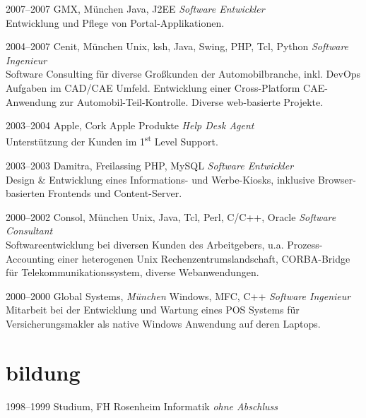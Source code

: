 \documentclass[]{friggeri-cv-a4}
\begin{document}
\begin{entrylist}
\entry
{2007--2007}
{GMX, München}
{Java, J2EE}
{\emph{Software Entwickler} \\
Entwicklung und Pflege von Portal-Applikationen.}
\end{entrylist}


\begin{entrylist}
\entry
{2004--2007}
{Cenit, München}
{Unix, ksh, Java, Swing, PHP, Tcl, Python}
{\emph{Software Ingenieur} \\
Software Consulting für diverse Großkunden der Automobilbranche, inkl. DevOps Aufgaben im CAD/CAE Umfeld. Entwicklung einer Cross-Platform CAE-Anwendung zur Automobil-Teil-Kontrolle. Diverse web-basierte Projekte.}
\end{entrylist}


\begin{entrylist}
\entry
{2003--2004}
{Apple, Cork}
{Apple Produkte}
{\emph{Help Desk Agent} \\
Unterstützung der Kunden im 1\textsuperscript{st} Level Support.}
\end{entrylist}

\begin{entrylist}
\entry
{2003--2003}
{Damitra, Freilassing}
{PHP, MySQL}
{\emph{Software Entwickler} \\
Design \& Entwicklung eines Informations- und Werbe-Kiosks, inklusive Browser-basierten Frontends und Content-Server.}
\end{entrylist}

\begin{entrylist}
\entry
{2000--2002}
{Consol, München}
{Unix, Java, Tcl, Perl, C/C++, Oracle}
{\emph{Software Consultant} \\
Softwareentwicklung bei diversen Kunden des Arbeitgebers, u.a. Prozess-Accounting einer heterogenen Unix Rechenzentrumslandschaft, CORBA-Bridge für Telekommunikationssystem, diverse Webanwendungen.}
\end{entrylist}

\begin{entrylist}
\entry
{2000--2000}
{Global Systems, \emph{München}}
{Windows, MFC, C++}
{\emph{Software Ingenieur} \\
Mitarbeit bei der Entwicklung und Wartung eines POS Systems für Versicherungsmakler als native Windows Anwendung auf deren Laptops.}
\end{entrylist}


\section{bildung}
\begin{entrylist}
\entry
{1998--1999}
{Studium, FH Rosenheim}
{Informatik}
{\textit{ohne Abschluss}}
\end{entrylist}
\end{document}
